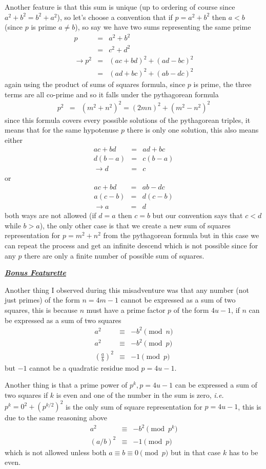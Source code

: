 \documentclass[aps,preprint,preprintnumbers,nofootinbib,showpacs,prd]{revtex4-1}
\newcommand{\ie}{{\it i.e.} }
\newcommand{\nbea}{\begin{eqnarray*}}
\newcommand{\neea}{\end{eqnarray*}}
\begin{document}
Another feature is that this sum is unique (up to ordering of course since $a^2 + b^2 = b^2 + a^2$), so let's choose a convention that if $p = a^2 + b^2$ then $a<b$ (since $p$ is prime $a \neq b$), so say we have two sums representing the same prime
%
\nbea
p & = & a^2 + b^2 \\
& = & c^2 + d^2 \\
\to p^2 & = & (ac + bd)^2 + (ad-bc)^2 \\
& = & (ad + bc)^2 + (ab-dc)^2
\neea
%
again using the product of sums of squares formula, since $p$ is prime, the three terms are all co-prime and so it falls under the pythagorean formula
%
\nbea
p^2 & = & (m^2 + n^2)^2 = (2mn)^2  + (m^2 - n^2)^2
\neea
%
since this formula covers every possible solutions of the pythagorean triples, it means that for the same hypotenuse $p$ there is only one solution, this also means either
%
\nbea
ac + bd & = & ad + bc \\
d(b-a) & = & c (b-a) \\
\to d & = & c
\neea
%
or
%
\nbea
ac + bd & = & ab - dc \\
a(c-b) & = & d(c-b) \\
\to a & = & d
\neea
%
both ways are not allowed (if $d=a$ then $c=b$ but our convention says that $c<d$ while $b > a$), the only other case is that we create a new sum of squares representation for $p = m^2 + n^2$ from the pythagorean formula but in this case we can repeat the process and get an infinite descend which is not possible since for any $p$ there are only a finite number of possible sum of squares.

\smallskip
\underline{\textit{\textbf{Bonus Featurette}}}
\smallskip

Another thing I observed during this misadventure was that any number (not just primes) of the form $n = 4m-1$ cannot be expressed as a sum of two squares, this is because $n$ must have a prime factor $p$ of the form $4u-1$, if $n$ can be expressed as a sum of two squares
%
\nbea
a^2 & \equiv & - b^2 \pmod{n} \\
a^2 & \equiv & - b^2 \pmod{p} \\
\left(\frac{a}{b}\right)^2 & \equiv & - 1 \pmod{p}
\neea
%
but $-1$ cannot be a quadratic residue mod $p = 4u-1$.

Another thing is that a prime power of $p^k, p = 4u-1$ can be expressed a sum of two squares if $k$ is even and one of the number in the sum is zero, \ie $p^k = 0^2 + (p^{k/2})^2$ is the only sum of square representation for $p =4u-1$, this is due to the same reasoning above
%
\nbea
a^2 & \equiv & - b^2 \pmod{p^k} \\
(a/b)^2 & \equiv & - 1 \pmod{p}
\neea
%
which is not allowed unless both $a \equiv b \equiv 0 \pmod{p}$ but in that case $k$ has to be even.
\end{document}

